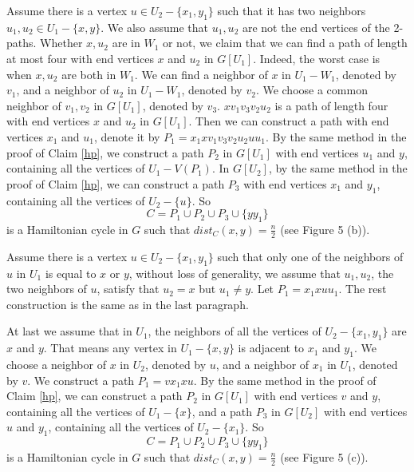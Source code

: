 \documentclass[11pt]{article}
\begin{document}
Assume there is a vertex $u\in U_2-\{x_1,y_1\}$ such that it has two neighbors $u_1,u_2\in U_1-\{x,y\}$. We also assume that $u_1,u_2$ are not the end vertices of the 2-paths. Whether $x,u_2$ are in $W_1$ or not, we claim that we can find a path of length at most four with end vertices $x$ and $u_2$ in $G[U_1]$. Indeed, the worst case is when $x,u_2$ are both in $W_1$. We can find a neighbor of $x$ in $U_1-W_1$, denoted by $v_1$, and a neighbor of $u_2$ in $U_1-W_1$, denoted by $v_2$. We choose a common neighbor of $v_1,v_2$ in $G[U_1]$, denoted by $v_3$. $xv_1v_3v_2u_2$ is a path of length four with end vertices $x$ and $u_2$ in $G[U_1]$. Then we can construct a path with end vertices $x_1$ and $u_1$, denote it by $P_1=x_1xv_1v_3v_2u_2uu_1$. By the same method in the proof of Claim \ref{hp}, we construct a path $P_2$ in $G[U_1]$ with end vertices $u_1$ and $y$, containing all the vertices of $U_1-V(P_1)$. In $G[U_2]$, by the same method in the proof of Claim \ref{hp}, we can construct a path $P_3$ with end vertices $x_1$ and $y_1$, containing all the vertices of $U_2-\{u\}$. So
$$C=P_1\cup P_2\cup P_3\cup \{yy_1\}$$
is a Hamiltonian cycle in $G$ such that $dist_C(x,y)=\frac{n}{2}$ (see Figure 5 (b)).


Assume there is a vertex $u\in U_2-\{x_1,y_1\}$ such that only one of the neighbors of $u$ in $U_1$ is equal to $x$ or $y$, without loss of generality, we assume that $u_1,u_2$, the two neighbors of $u$, satisfy that $u_2=x$ but $u_1\not =y$. Let $P_1=x_1xuu_1$. The rest construction is the same as in the last paragraph.

At last we assume that in $U_1$, the neighbors of all the vertices of $U_2-\{x_1,y_1\}$ are $x$ and $y$. That means any vertex in $U_1-\{x,y\}$ is adjacent to $x_1$ and $y_1$. We choose a neighbor of $x$ in $U_2$, denoted by $u$, and a neighbor of $x_1$ in $U_1$, denoted by $v$. We construct a path $P_1=vx_1xu$. By the same method in the proof of Claim \ref{hp}, we can construct a path $P_2$ in $G[U_1]$ with end vertices $v$ and $y$, containing all the vertices of $U_1-\{x\}$, and a path $P_3$ in $G[U_2]$ with end vertices $u$ and $y_1$, containing all the vertices of $U_2-\{x_1\}$. So
$$C=P_1\cup P_2\cup P_3\cup \{yy_1\}$$
is a Hamiltonian cycle in $G$ such that $dist_C(x,y)=\frac{n}{2}$ (see Figure 5 (c)).
\end{document}
